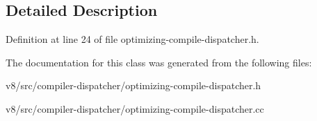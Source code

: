 \subsection{Detailed Description}


Definition at line 24 of file optimizing-\/compile-\/dispatcher.\+h.



The documentation for this class was generated from the following files\+:\begin{DoxyCompactItemize}
\item 
v8/src/compiler-\/dispatcher/optimizing-\/compile-\/dispatcher.\+h\item 
v8/src/compiler-\/dispatcher/optimizing-\/compile-\/dispatcher.\+cc\end{DoxyCompactItemize}
